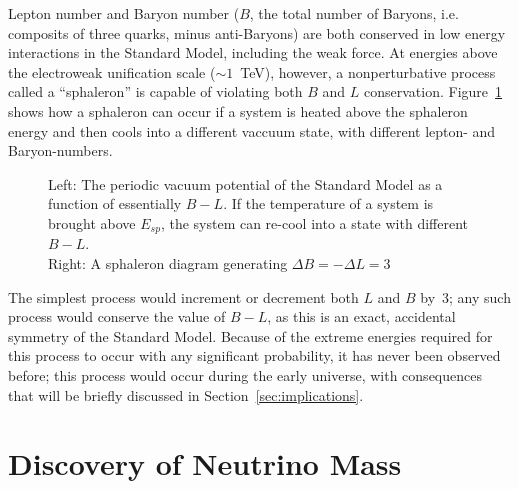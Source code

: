 \documentclass[/main.tex]{subfiles}
\begin{document}
Lepton number and Baryon number ($B$, the total number of Baryons, i.e. composits of three quarks, minus anti-Baryons) are both conserved in low energy interactions in the Standard Model, including the weak force.
At energies above the electroweak unification scale ($\sim1$~TeV), however, a nonperturbative process called a ``sphaleron'' is capable of violating both $B$ and $L$ conservation.
Figure~\ref{fig:sphaleron} shows how a sphaleron can occur if a system is heated above the sphaleron energy and then cools into a different vaccuum state, with different lepton- and Baryon-numbers.
\begin{figure}[t]
  \centering
  \caption[Standard Model Sphaleron]{\label{fig:sphaleron}
    Left: The periodic vacuum potential of the Standard Model as a function of essentially $B-L$. If the temperature of a system is brought above $E_{sp}$, the system can re-cool into a state with different $B-L$.\\
    Right: A sphaleron diagram generating $\Delta B = -\Delta L = 3$
  }
\end{figure}
The simplest process would increment or decrement both $L$ and $B$ by~3; any such process would conserve the value of $B-L$, as this is an exact, accidental symmetry of the Standard Model.
Because of the extreme energies required for this process to occur with any significant probability, it has never been observed before; this process would occur during the early universe, with consequences that will be briefly discussed in Section~\ref{sec:implications}.

\section{Discovery of Neutrino Mass}
\end{document}
